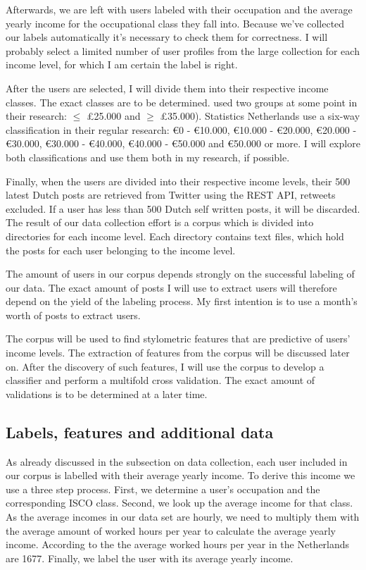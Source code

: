 \documentclass[11pt, a4paper]{article}
\begin{document}
Afterwards, we are left with users labeled with their occupation and the average yearly income for the occupational class they fall into. Because we've collected our labels automatically it's necessary to check them for correctness. I will probably select a limited number of user profiles from the large collection for each income level, for which I am certain the label is right. 

After the users are selected, I will divide them into their respective income classes. The exact classes are to be determined. \citet{flekova} used two groups at some point in their research: $\leq$ \pounds 25.000 and $\geq$ \pounds 35.000). Statistics Netherlands use a six-way classification in their regular research: \euro 0 - \euro 10.000, \euro 10.000 - \euro 20.000, \euro 20.000 - \euro 30.000, \euro 30.000 - \euro 40.000, \euro 40.000 - \euro 50.000 and \euro 50.000 or more. I will explore both classifications and use them both in my research, if possible.

Finally, when the users are divided into their respective income levels, their 500 latest Dutch posts are retrieved from Twitter using the REST API, retweets excluded. If a user has less than 500 Dutch self written posts, it will be discarded. The result of our data collection effort is a corpus which is divided into directories for each income level. Each directory contains text files, which hold the posts for each user belonging to the income level. 

The amount of users in our corpus depends strongly on the successful labeling of our data. The exact amount of posts I will use to extract users will therefore depend on the yield of the labeling process. My first intention is to use a month's worth of posts to extract users.

The corpus will be used to find stylometric features that are predictive of users' income levels. The extraction of features from the corpus will be discussed later on. After the discovery of such features, I will use the corpus to develop a classifier and perform a multifold cross validation. The exact amount of validations is to be determined at a later time.

\subsection{Labels, features and additional data}
As already discussed in the subsection on data collection, each user included in our corpus is labelled with their average yearly income. To derive this income we use a three step process. First, we determine a user's occupation and the corresponding ISCO class. Second, we look up the average income for that class. As the average incomes in our data set are hourly, we need to multiply them with the average amount of worked hours per year to calculate the average yearly income. According to the \citet{hours} the average worked hours per year in the Netherlands are 1677. Finally, we label the user with its average yearly income.
\end{document}
